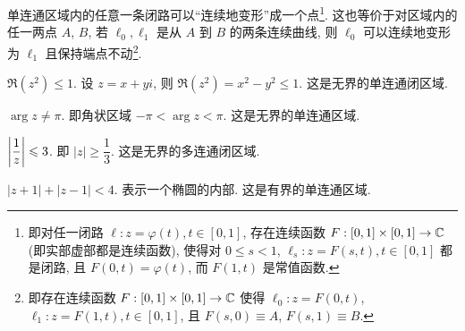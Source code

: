 单连通区域内的任意一条闭路可以``连续地变形''成一个点\footnote{%
  即对任一闭路 $\ell: z=\varphi(t),t\in[0,1]$, 存在连续函数 $F:[0,1]\times[0,1]\to {\mathbb{C}}$ (即实部虚部都是连续函数), 使得对 $0\le s<1$, $\ell_s: z=F(s,t),t\in[0,1]$
  都是闭路, 且 $F(0,t)=\varphi(t)$, 而 $F(1,t)$ 是常值函数.%
}. 这也等价于对区域内的任一两点 $A$, $B$, 若 $\ell_0,\ell_1$ 是从 $A$ 到 $B$ 的两条连续曲线, 则 $\ell_0$ 可以连续地变形为 $\ell_1$ 且保持端点不动\footnote{%
  即存在连续函数 $F:[0,1]\times[0,1]\to {\mathbb{C}}$ 使得
  $\ell_0: z=F(0,t)$, $\ell_1: z=F(1,t),t\in[0,1]$, 且 $F(s,0)\equiv A$, $F(s,1)\equiv B$.
}.

\begin{example}\delspace
  \begin{enumnopar}[(i)]
    \item $\Re(z^2)\le1$. 设 $z=x+yi$, 则 $\Re(z^2)=x^2-y^2\le1$. 这是无界的单连通闭区域.
    \item $\arg z\neq \pi$. 即角状区域 $-\pi<\arg z<\pi$. 这是无界的单连通区域.
    \item $\left|\dfrac1z\right|\leqslant3$. 即 $|z|\ge\dfrac13$. 这是无界的多连通闭区域.
    \item $|z+1|+|z-1|<4$. 表示一个椭圆的内部. 这是有界的单连通区域.
  \end{enumnopar}
\end{example}

